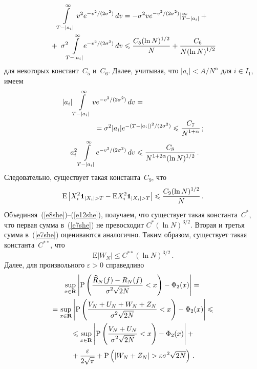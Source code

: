 \begin{multicols}{2}
\noindent
\begin{multline*}
\int\limits_{T-|a_i|}^{\infty}v^2e^{-{v^2}/(2\sigma^2)}\,dv=
-\sigma^2ve^{-{v^2}/(2\sigma^2)}\vert^{\infty}_{T-|a_i|}+{}\\
{}+\;\sigma^2\!\!\int\limits_{T-|a_i|}^{\infty}\!\!
e^{-{v^2}/(2\sigma^2)}\,dv
\leqslant\displaystyle\frac{\displaystyle C_5(\ln N)^{1/2}\mathstrut}{\displaystyle N\mathstrut}+\displaystyle\frac{\displaystyle C_6\mathstrut}{\displaystyle N(\ln N)^{1/2}\mathstrut}
\end{multline*}
для некоторых констант~$C_5$ и~$C_6$. Далее, учитывая, что $|a_i|<A/N^{\alpha}$ для $i\in I_1$, имеем
\begin{align*}
\left\vert a_i\right\vert \int\limits_{T-|a_i|}^{\infty} ve^{-{v^2}/(2\sigma^2)}\,dv
&=\\
& \hspace*{-20mm}{}=\sigma^2|a_i|e^{-{(T-|a_i|)^2}/(2\sigma^2)}%
\leqslant \fr{C_7}{N^{1+\alpha}}\,;\\
a_i^2\int\limits_{T-|a_i|}^{\infty}\!e^{-{v^2}/(2\sigma^2)}\,dv&\leqslant\fr{C_8}{N^{1+2\alpha}(\ln N)^{1/2}}\,.
\end{align*}
Следовательно, существует такая константа~$C_9$, что
\begin{equation}
\mbox{E}\left\vert X_i^2\Ik_{|X_i|> T}-\mbox{E}X_i^2\Ik_{|X_i|> T}\right\vert\leqslant
\fr{C_9(\ln N)^{1/2}}{N}\,.
\label{e12she}
\end{equation}
Объединяя~(\ref{e8she})--(\ref{e12she}), получаем, что существует такая константа~$C^*$, что первая сумма 
в~(\ref{e7she}) не превосходит $C^*(\ln N)^{3/2}$. Вторая и третья сумма в~(\ref{e7she}) 
оцениваются аналогично. Таким образом, существует такая константа~$C^{**}$, что
\begin{equation}
\mbox{E}|W_N|\leqslant C^{**}(\ln N)^{3/2}\,.
\label{e13she}
\end{equation}
Далее, для произвольного $\varepsilon>0$ справедливо
\begin{multline*}
\sup\limits_{x\in\mathbf{R}}\left\vert\mbox{P}\left(\fr{\widehat{R}_N(f)-R_N(f)}{\sigma^2\sqrt{2N}}<x\right)-
\Phi_2(x)\right\vert={}\\
{}=
\sup\limits_{x\in\mathbf{R}}\left\vert\mbox{P}\left(\fr{V_N+U_N+W_N+Z_N}{\sigma^2\sqrt{2N}}<x\right)-\Phi_2(x)\right\vert\leqslant{}\\
{}\leqslant\sup\limits_{x\in\mathbf{R}}\left\vert\mbox{P}\left(\fr{V_N+U_N}{\sigma^2\sqrt{2N}}<x\right)-\Phi_2(x)\right\vert+{}\\
{}+
\fr{\varepsilon}{2\sqrt{\pi}}+\mbox{P}\left(\left\vert W_N+Z_N\right\vert>\varepsilon\sigma^2\sqrt{2N}\right)\,.

\end{multline*}
\end{multicols}
